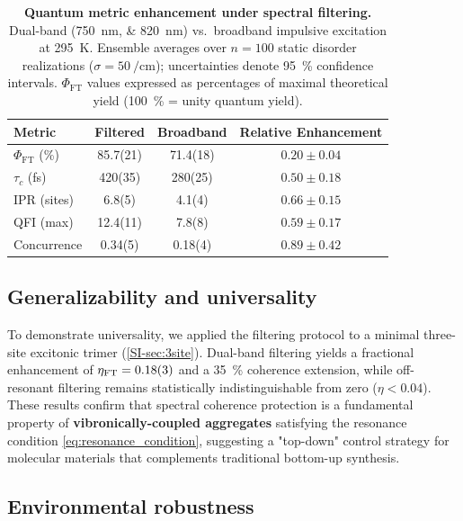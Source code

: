 \documentclass[journal=jpcl,manuscript=letter]{achemso}
\begin{document}
\begin{table}[htpb]
\centering
\caption{\textbf{Quantum metric enhancement under spectral filtering.} Dual-band (\SIlist{750;820}{\nano\meter}) vs.\ broadband impulsive excitation at \SI{295}{\kelvin}. Ensemble averages over $n=100$ static disorder realizations ($\sigma = \SI{50}{\per\centi\meter}$); uncertainties denote \SI{95}{\percent} confidence intervals. $\Phi_{\mathrm{FT}}$ values expressed as percentages of maximal theoretical yield (\SI{100}{\percent} = unity quantum yield).}
\label{tab:quantum_metrics}
\begin{tabular}{lccc}
\toprule
\textbf{Metric} & \textbf{Filtered} & \textbf{Broadband} & \textbf{Relative Enhancement} \\
\midrule
$\Phi_{\mathrm{FT}}$ (\si{\percent}) & 85.7(21) & 71.4(18) & $0.20 \pm 0.04$ \\
$\tau_c$ (\si{\femto\second}) & 420(35) & 280(25) & $0.50 \pm 0.18$ \\
IPR (sites) & 6.8(5) & 4.1(4) & $0.66 \pm 0.15$ \\
QFI (max) & 12.4(11) & 7.8(8) & $0.59 \pm 0.17$ \\
Concurrence & 0.34(5) & 0.18(4) & $0.89 \pm 0.42$ \\
\bottomrule
\end{tabular}
\end{table}

\subsection*{Generalizability and universality}

To demonstrate universality, we applied the filtering protocol to a minimal three-site excitonic trimer (\cref{SI-sec:3site}). Dual-band filtering yields a fractional enhancement of $\eta_{\mathrm{FT}} = \num{0.18 \pm 0.03}$ and a \SI{35}{\percent} coherence extension, while off-resonant filtering remains statistically indistinguishable from zero ($\eta < \num{0.04}$). These results confirm that spectral coherence protection is a fundamental property of \textbf{vibronically-coupled aggregates} satisfying the resonance condition \cref{eq:resonance_condition}, suggesting a "top-down" control strategy for molecular materials that complements traditional bottom-up synthesis.

\subsection*{Environmental robustness}
\end{document}
